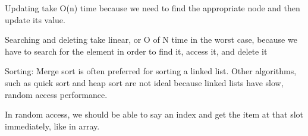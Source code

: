     Updating
      take O(n) time 
      because we need to find the appropriate node and then update its value.

    Searching and deleting
      take linear, or O of N time in the worst case, 
      because we have to search for the element in order to find it, access it, and delete it

  Sorting:
    Merge sort is often preferred for sorting a linked list. 
    Other algorithms, such as quick sort and heap sort are not ideal because linked lists have slow, random access performance. 

    In random access, we should be able to say an index and get the item at that slot immediately, like in array.